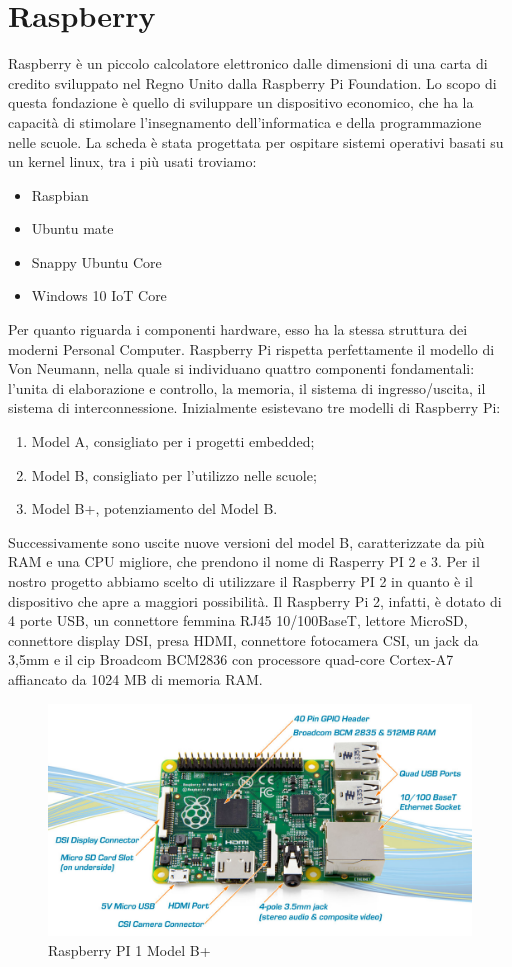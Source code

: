 \section{Raspberry}
Raspberry è un piccolo calcolatore elettronico dalle dimensioni di una
carta di credito sviluppato nel Regno Unito dalla Raspberry Pi
Foundation. Lo scopo di questa fondazione è quello di sviluppare un
dispositivo economico, che ha la capacità di stimolare l'insegnamento
dell'informatica e della programmazione nelle scuole. La scheda è stata
progettata per ospitare sistemi operativi basati su un kernel linux, tra i
più usati troviamo:
\begin{itemize}
\item Raspbian
\item Ubuntu mate
\item Snappy Ubuntu Core
\item Windows 10 IoT Core
\end{itemize}
Per quanto riguarda i componenti hardware, esso ha la stessa struttura
dei moderni Personal Computer. Raspberry Pi rispetta perfettamente il
modello di Von Neumann, nella quale si individuano quattro componenti
fondamentali: l'unita di elaborazione e controllo, la memoria, il sistema
di ingresso/uscita, il sistema di interconnessione. Inizialmente esistevano tre modelli di Raspberry Pi:
\begin{enumerate}
\item Model A, consigliato per i progetti embedded;
\item Model B, consigliato per l'utilizzo nelle scuole;
\item Model B+, potenziamento del Model B.
\end{enumerate}
Successivamente sono uscite nuove versioni del model B, caratterizzate da più RAM e una CPU migliore, che prendono il nome di Rasperry PI 2 e 3.
Per il nostro progetto abbiamo scelto di utilizzare il Raspberry PI 2 in
quanto è il dispositivo che apre a maggiori possibilità. Il Raspberry Pi 2,
infatti, è dotato di 4 porte USB, un connettore femmina RJ45
10/100BaseT, lettore MicroSD, connettore display DSI, presa HDMI,
connettore fotocamera CSI, un jack da 3,5mm e il cip Broadcom
BCM2836 con processore quad-core Cortex-A7 affiancato da 1024 MB di
memoria RAM.
\begin{figure}[ht]
\centering
\includegraphics[scale=0.3]{Immagini/raspberry.png}
\caption{Raspberry PI 1 Model B+}
\end{figure}

